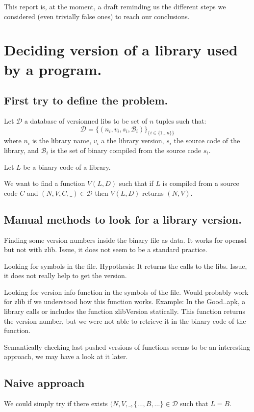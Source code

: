 \documentclass{article}
\begin{document}
    This report is, at the moment, a draft reminding us the different steps we
    considered (even trivially false ones) to reach our conclusions.

   \section{Deciding version of a library used by a program.} 

   \subsection{First try to define the problem.}

   Let $\mathcal{D}$ a database of versionned libs to be set of $n$ tuples such that:
    \[ \mathcal{D} = \{ (n_i, v_i, s_i, \mathcal{B}_i) \}_{\{i \in \{1 \dots n\}\}}  \]
    where $n_i$ is the library name, $v_i$ a the library version, $s_i$ the source
    code of the library, and $\mathcal{B}_i$ is the set of binary compiled
    from the source code $s_i$. 

    Let $L$ be a binary code of a library.

    We want to find a function $V(L,D)$ such that if $L$ is compiled from a
    source code $C$ and $(N, V, C, \_) \in \mathcal{D}$ then $V(L,D)$ returns
    $(N,V)$.

    \subsection{Manual methods to look for a library version.}
    Finding some version numbers inside the binary file as data.
    It works for openssl but not with zlib.
    Issue, it does not seem to be a standard practice.

    Looking for symbols in the file. 
    Hypothesis: It returns the calls to the libs.
    Issue, it does not really help to get the version.

    Looking for version info function in the symbols of the file. Would
    probably work for zlib if we understood how this function works.
    Example: In the Good..apk, a library calls or includes the function zlibVersion statically. This function returns the version number, but we were not able to retrieve it in the binary code of the function.
    
    Semantically checking last pushed versions of functions seems to be an
    interesting approach, we may have a look at it later.

    \subsection{Naive approach}\label{naive-notations}
    We could simply try if there exists $(N, V, \_, \{\dots, B, \dots\} \in
    \mathcal{D}$ such that $L = B$.
\end{document}
